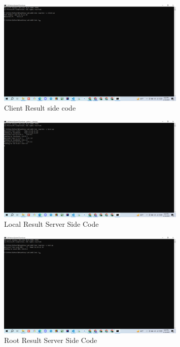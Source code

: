 \documentclass[11pt]{article}
\begin{document}
\begin{itemize}
\begin{itemize}
        \begin{figure}[H]
        \centering
        \includegraphics[width=0.8\textwidth]{Screenshot (169).png}
        \caption{Client Result side code}
        \label{fig:1}
    \end{figure}
    
    \begin{figure}[H]
        \centering
        \includegraphics[width=0.8\textwidth]{Screenshot (170).png}
        \caption{Local Result Server Side Code}
        \label{fig:2}
    \end{figure}
    
    \begin{figure}[H]
      \centering
      \includegraphics[width=0.8\textwidth]{Screenshot (171).png}
      \caption{Root Result Server Side Code}
      \label{fig:3}
    \end{figure}
    

\end{itemize}
\end{itemize}
\end{document}
